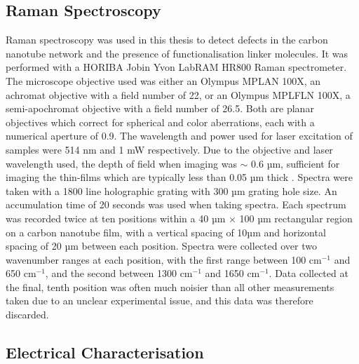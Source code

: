 \documentclass[
  a4paper,
]{scrbook}
\begin{document}
\hypertarget{sec-raman-characterisation}{%
\subsection{Raman Spectroscopy}\label{sec-raman-characterisation}}

Raman spectroscopy was used in this thesis to detect defects in the
carbon nanotube network and the presence of functionalisation linker
molecules. It was performed with a HORIBA Jobin Yvon LabRAM HR800 Raman
spectrometer. The microscope objective used was either an Olympus MPLAN
100X, an achromat objective with a field number of 22, or an Olympus
MPLFLN 100X, a semi-apochromat objective with a field number of 26.5.
Both are planar objectives which correct for spherical and color
aberrations, each with a numerical aperture of 0.9. The wavelength and
power used for laser excitation of samples were 514 nm and 1 mW
respectively. Due to the objective and laser wavelength used, the depth
of field when imaging was \(\sim\) 0.6 µm, sufficient for imaging the
thin-films which are typically less than 0.05 µm thick \autocite{DOF}.
Spectra were taken with a 1800 line holographic grating with 300 µm
grating hole size. An accumulation time of 20 seconds was used when
taking spectra. Each spectrum was recorded twice at ten positions within
a 40 µm \(\times\) 100 µm rectangular region on a carbon nanotube film,
with a vertical spacing of 10µm and horizontal spacing of 20 µm between
each position. Spectra were collected over two wavenumber ranges at each
position, with the first range between 100 cm\(^{-1}\) and 650
cm\(^{-1}\), and the second between 1300 cm\(^{-1}\) and 1650
cm\(^{-1}\). Data collected at the final, tenth position was often much
noisier than all other measurements taken due to an unclear experimental
issue, and this data was therefore discarded.

\hypertarget{sec-electrical-characterisation}{%
\subsection{Electrical
Characterisation}\label{sec-electrical-characterisation}}
\end{document}
